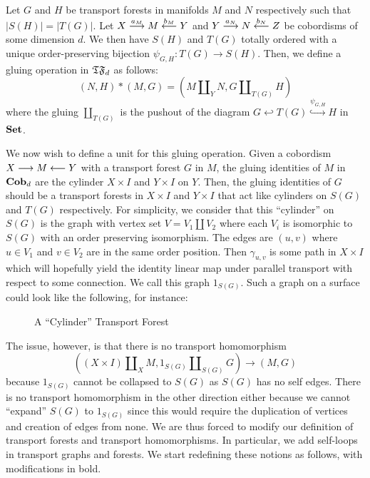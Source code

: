 \documentclass[./Thick_TQFTs_and_Quantum_Information.tex]{subfiles}
\begin{document}
\begin{defn}
Let $G$ and $H$ be transport forests in manifolds $M$ and $N$ respectively such
that $|S(H)| = |T(G)|$. Let $X \to[a_M] M \ot[b_M] Y$ and
$Y \to[a_N] N \ot[b_N] Z$ be cobordisms of some dimension $d$. We then have
$S(H)$ and $T(G)$ totally ordered with a unique order-preserving bijection
$\psi_{G, H} : T(G) \to S(H)$. Then, we define a gluing operation in $\TF_d$ as
follows:
\[
  (N, H) * (M, G) = (M \amalg_{Y} N, G \amalg_{T(G)} H)
\]
where the gluing $\amalg_{T(G)}$ is the pushout of the diagram
$G \hookleftarrow T(G) \stackrel{\psi_{G, H}}{\hookrightarrow} H$ in
$\Set$.
\end{defn}

We now wish to define a unit for this gluing operation. Given a cobordism
$X \to M \ot Y$ with a transport forest $G$ in $M$, the gluing identities of $M$
in $\Cob_d$ are the cylinder $X \times I$ and $Y \times I$ on $Y$. Then, the
gluing identities of $G$ should be a transport forests in $X \times I$ and
$Y \times I$ that act like cylinders on $S(G)$ and $T(G)$ respectively. For
simplicity, we consider that this ``cylinder'' on $S(G)$ is the graph with
vertex set $V = V_1 \amalg V_2$ where each $V_i$ is isomorphic to $S(G)$ with an
order preserving isomorphism. The edges are $(u, v)$ where $u \in V_1$ and
$v \in V_2$ are in the same order position. Then $\gamma_{u, v}$ is some path
in $X \times I$ which will hopefully yield the identity linear map under
parallel transport with respect to some connection. We call this graph
$1_{S(G)}$. Such a graph on a surface could look like the following, for
instance:
\begin{figure}[H]
\begin{center}

\end{center}
\caption{A ``Cylinder'' Transport Forest}
\end{figure}

The issue, however, is that there is no transport homomorphism
\[
  ((X \times I) \amalg_X M, 1_{S(G)} \amalg_{S(G)} G) \to (M, G)
\]
because $1_{S(G)}$ cannot be collapsed to $S(G)$ as $S(G)$ has no self edges.
There is no transport homomorphism in the other direction either because we
cannot ``expand'' $S(G)$ to $1_{S(G)}$ since this would require the duplication
of vertices and creation of edges from none. We are thus forced to modify our
definition of transport forests and transport homomorphisms. In particular, we
add self-loops in transport graphs and forests. We start redefining these
notions as follows, with modifications in bold.
\end{document}
